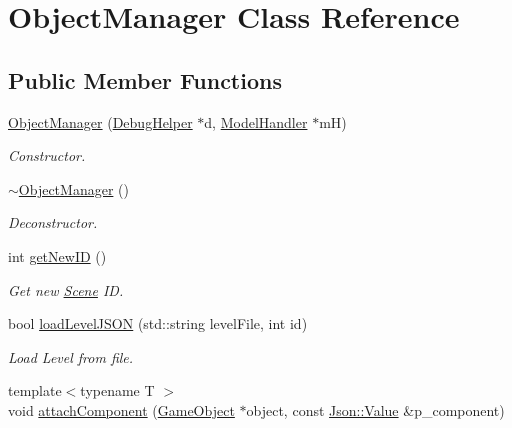 \hypertarget{class_object_manager}{\section{Object\+Manager Class Reference}
\label{class_object_manager}
}
\subsection*{Public Member Functions}
\begin{DoxyCompactItemize}
\item 
\hypertarget{class_object_manager_a95ac987cd70496b17d7ac6bd2a79682c}{\hyperlink{class_object_manager_a95ac987cd70496b17d7ac6bd2a79682c}{Object\+Manager} (\hyperlink{class_debug_helper}{Debug\+Helper} $\ast$d, \hyperlink{class_model_handler}{Model\+Handler} $\ast$m\+H)}\label{class_object_manager_a95ac987cd70496b17d7ac6bd2a79682c}

\begin{DoxyCompactList}\small\item\em Constructor. \end{DoxyCompactList}\item 
\hypertarget{class_object_manager_a25b057e6d1e60c9cbeb29d41923d8c2c}{\hyperlink{class_object_manager_a25b057e6d1e60c9cbeb29d41923d8c2c}{$\sim$\+Object\+Manager} ()}\label{class_object_manager_a25b057e6d1e60c9cbeb29d41923d8c2c}

\begin{DoxyCompactList}\small\item\em Deconstructor. \end{DoxyCompactList}\item 
\hypertarget{class_object_manager_a550d7be8dd5e15d912c533dd3e4e31ab}{int \hyperlink{class_object_manager_a550d7be8dd5e15d912c533dd3e4e31ab}{get\+New\+I\+D} ()}\label{class_object_manager_a550d7be8dd5e15d912c533dd3e4e31ab}

\begin{DoxyCompactList}\small\item\em Get new \hyperlink{class_scene}{Scene} I\+D. \end{DoxyCompactList}\item 
\hypertarget{class_object_manager_a845db4dd11b1a5d7d1817c53fd4ab9eb}{bool \hyperlink{class_object_manager_a845db4dd11b1a5d7d1817c53fd4ab9eb}{load\+Level\+J\+S\+O\+N} (std\+::string level\+File, int id)}\label{class_object_manager_a845db4dd11b1a5d7d1817c53fd4ab9eb}

\begin{DoxyCompactList}\small\item\em Load Level from file. \end{DoxyCompactList}\item 
\hypertarget{class_object_manager_a1fb1d8ec2c389970395beb9d1329de50}{{\footnotesize template$<$typename T $>$ }\\void \hyperlink{class_object_manager_a1fb1d8ec2c389970395beb9d1329de50}{attach\+Component} (\hyperlink{class_game_object}{Game\+Object} $\ast$object, const \hyperlink{class_json_1_1_value}{Json\+::\+Value} \&p\+\_\+component)}\label{class_object_manager_a1fb1d8ec2c389970395beb9d1329de50}


\end{DoxyCompactItemize}
